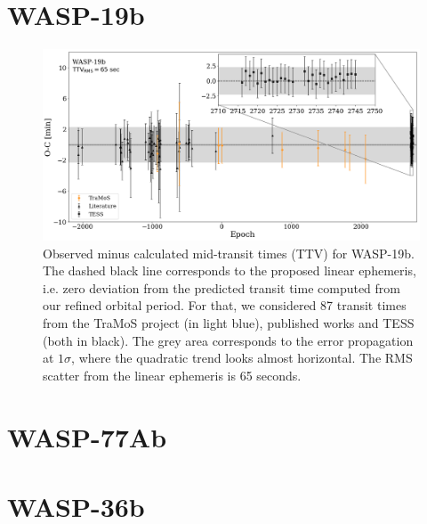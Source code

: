 \section{WASP-19b}

\begin{figure}[H]
\includegraphics[width=1.0\textwidth]{imagenes/WASP19_TTV.png}
\caption{Observed minus calculated mid-transit times (TTV) for WASP-19b. The dashed black line corresponds to the proposed linear ephemeris, i.e. zero deviation from the predicted transit time  computed from our refined orbital period. For that, we considered 87 transit times from the TraMoS project (in light blue), published works and TESS (both in black). The grey area corresponds to the error propagation at $1\sigma$, where the quadratic trend looks almost horizontal.  The RMS scatter from the linear ephemeris is 65 seconds.}
\label{wasp19_ttv}
\end{figure}

\section{WASP-77Ab}

\section{WASP-36b}
